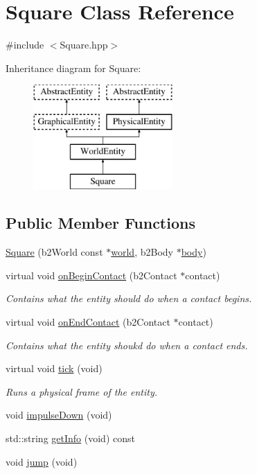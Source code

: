 \hypertarget{class_square}{}\section{Square Class Reference}
\label{class_square}


{\ttfamily \#include $<$Square.\+hpp$>$}

Inheritance diagram for Square\+:\begin{figure}[H]
\begin{center}
\leavevmode
\includegraphics[height=4.000000cm]{class_square}
\end{center}
\end{figure}
\subsection*{Public Member Functions}
\begin{DoxyCompactItemize}
\item 
\hyperlink{class_square_a3c81cb469cb4f7c496617ba020c35582}{Square} (b2\+World const $\ast$\hyperlink{class_physical_entity_ae6c23c3817c4d7f9a867abed05cd7834}{world}, b2\+Body $\ast$\hyperlink{class_physical_entity_a91a5016393dd890c490b329abd938ec7}{body})
\item 
virtual void \hyperlink{class_square_a64094ed22922bb6f98271dbd26be408b}{on\+Begin\+Contact} (b2\+Contact $\ast$contact)
\begin{DoxyCompactList}\small\item\em Contains what the entity should do when a contact begins. \end{DoxyCompactList}\item 
virtual void \hyperlink{class_square_a42f034da822a46094e943f1b617b727e}{on\+End\+Contact} (b2\+Contact $\ast$contact)
\begin{DoxyCompactList}\small\item\em Contains what the entity shoukd do when a contact ends. \end{DoxyCompactList}\item 
virtual void \hyperlink{class_square_afb90e037b269f878406d52bee92e7290}{tick} (void)
\begin{DoxyCompactList}\small\item\em Runs a physical frame of the entity. \end{DoxyCompactList}\item 
void \hyperlink{class_square_ac7b9e76c633bbb107f0af3e48ffa90f8}{impulse\+Down} (void)
\item 
std\+::string \hyperlink{class_square_ae58ee8ae5092447d175966a617bc70ec}{get\+Info} (void) const 
\item 
void \hyperlink{class_square_a0166e843739e678f8a286f525b4b5662}{jump} (void)
\end{DoxyCompactItemize}
